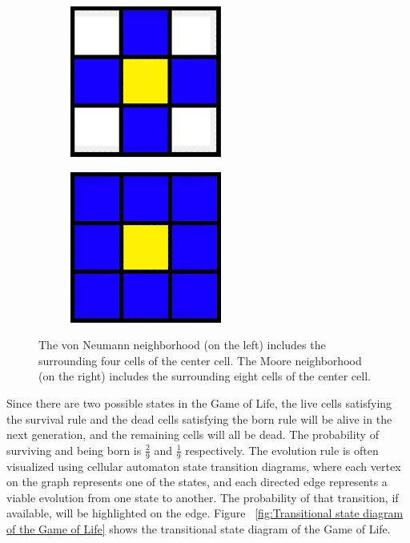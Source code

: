 \documentclass[12pt]{article}
\numberwithin{figure}{section} %
\begin{document}
\begin{figure}[H]
	\begin{subfigure}{0.48\textwidth}
     		\centering
     		\includegraphics[width=.6\linewidth]{Section1/1}
   	\end{subfigure}\hfill
   	\begin{subfigure}{0.48\textwidth}
     		\centering
     		\includegraphics[width=.6\linewidth]{Section1/2}
   	\end{subfigure}
   	\caption[Neighborhood configuration]{The von Neumann neighborhood (on the left) includes the surrounding four cells of the center cell. The Moore neighborhood (on the right) includes the surrounding eight cells of the center cell.}
   	\vspace{-1.5em}
   	\label{fig:Neighborhood configuration}
\end{figure}

Since there are two possible states in the Game of Life, the live cells satisfying the survival rule and the dead cells satisfying the born rule will be alive in the next generation, and the remaining cells will all be dead. The probability of surviving and being born is $\frac{2}{9}$ and $\frac{1}{9}$ respectively. The evolution rule is often visualized using cellular automaton state transition diagrams, where each vertex on the graph represents one of the states, and each directed edge represents a viable evolution from one state to another. The probability of that transition, if available, will be highlighted on the edge. Figure ~\ref{fig:Transitional state diagram of the Game of Life} shows the transitional state diagram of the Game of Life. 
\end{document}

